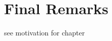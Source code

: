 \documentclass[
	bibliography=totoc,
	listof=totoc,
]{scrbook}
\begin{document}
\section{Final Remarks} %


\begin{marker}\begin{justify}
see motivation for chapter
\end{justify}\end{marker}


\end{document}

